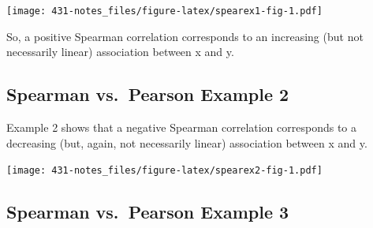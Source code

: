 \documentclass[
]{book}
\newenvironment{Shaded}{\begin{snugshade}}{\end{snugshade}}
\newcommand{\DataTypeTok}[1]{\textcolor[rgb]{0.13,0.29,0.53}{#1}}
\newcommand{\DecValTok}[1]{\textcolor[rgb]{0.00,0.00,0.81}{#1}}
\newcommand{\KeywordTok}[1]{\textcolor[rgb]{0.13,0.29,0.53}{\textbf{#1}}}
\newcommand{\NormalTok}[1]{#1}
\newcommand{\OperatorTok}[1]{\textcolor[rgb]{0.81,0.36,0.00}{\textbf{#1}}}
\newcommand{\OtherTok}[1]{\textcolor[rgb]{0.56,0.35,0.01}{#1}}
\newcommand{\StringTok}[1]{\textcolor[rgb]{0.31,0.60,0.02}{#1}}
\begin{document}
\texttt{[image: 431-notes\_files/figure-latex/spearex1-fig-1.pdf]}

So, a positive Spearman correlation corresponds to an increasing (but not necessarily linear) association between x and y.

\hypertarget{spearman-vs.-pearson-example-2}{%
\subsection{Spearman vs.~Pearson Example 2}\label{spearman-vs.-pearson-example-2}}

Example 2 shows that a negative Spearman correlation corresponds to a decreasing (but, again, not necessarily linear) association between x and y.

\begin{Shaded}
\end{Shaded}

\texttt{[image: 431-notes\_files/figure-latex/spearex2-fig-1.pdf]}

\hypertarget{spearman-vs.-pearson-example-3}{%
\subsection{Spearman vs.~Pearson Example 3}\label{spearman-vs.-pearson-example-3}}
\end{document}
